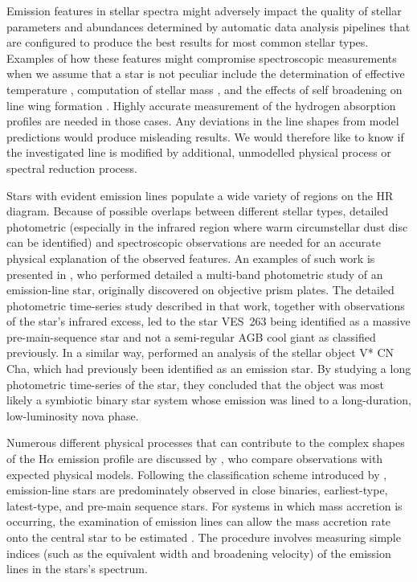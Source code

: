 Emission features in stellar spectra might adversely impact the quality of stellar parameters and abundances determined by automatic data analysis pipelines that are configured to produce the best results for most common stellar types. Examples of how these features might compromise spectroscopic measurements when we assume that a star is not peculiar include the determination of effective temperature \cite{2011A&A...531A..83C, 2018A&A...615A.139A, 2019A&A...624A..10G}, computation of stellar mass \cite{2016ApJ...823..114N, 2016A&A...594A.120B}, and the effects of self broadening on line wing formation \cite{2000A&A...363.1091B, 2008A&A...480..581A}. Highly accurate measurement of the hydrogen absorption profiles are needed in those cases. Any deviations in the line shapes from model predictions would produce misleading results. We would therefore like to know if the investigated line is modified by additional, unmodelled physical process or spectral reduction process.

Stars with evident emission lines populate a wide variety of regions on the HR diagram. Because of possible overlaps between different stellar types, detailed photometric (especially in the infrared region where warm circumstellar dust disc can be identified) and spectroscopic observations are needed for an accurate physical explanation of the observed features. An examples of such work is presented in \citet{2019MNRAS.488.5536M}, who performed detailed a multi-band photometric study of an emission-line star, originally discovered on objective prism plates. The detailed photometric time-series study described in that work, together with observations of the star's infrared excess, led to the star VES~263 being identified as a massive pre-main-sequence star and not a semi-regular AGB cool giant as classified previously. In a similar way, \citet{2020arXiv200207852L} performed an analysis of the stellar object V* CN Cha, which had previously been identified as an emission star. By studying a long photometric time-series of the star, they concluded that the object was most likely a symbiotic binary star system whose emission was lined to a long-duration, low-luminosity nova phase.

Numerous different physical processes that can contribute to the complex shapes of the H$\alpha$ emission profile are discussed by \citet{1996A&AS..120..229R, 2011AJ....141..150J, 2014ApJ...795...82S, 2018AJ....156...97I}, who compare observations with expected physical models. Following the classification scheme introduced by \citet{2007ASSL..342.....K}, emission-line stars are predominately observed in close binaries, earliest-type, latest-type, and pre-main sequence stars. For systems in which mass accretion is occurring, the examination of emission lines can allow the mass accretion rate onto the central star to be estimated \cite{2003ApJ...582.1109W, 2004A&A...424..603N}. The procedure involves measuring simple indices (such as the equivalent width and broadening velocity) of the emission lines in the stars's spectrum.

